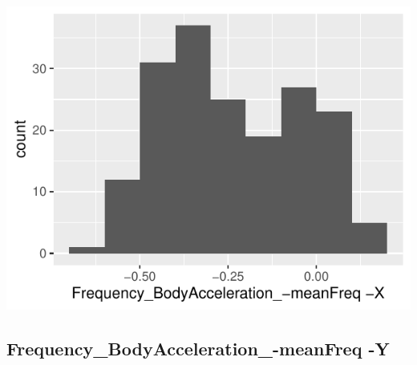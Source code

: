 \documentclass[
]{article}
\begin{document}
\begin{minipage}{0.25 \textwidth}

\includegraphics{codebook_tidydatasub_files/figure-latex/Var-49-Frequency-BodyAcceleration--meanFreq--X-1.pdf}

\end{minipage}

\noindent\makebox[\linewidth]{\rule{\textwidth}{0.4pt}}

\hypertarget{frequency_bodyacceleration_-meanfreq--y}{%
\subsection{Frequency\_BodyAcceleration\_-meanFreq
-Y}\label{frequency_bodyacceleration_-meanfreq--y}}
\end{document}
